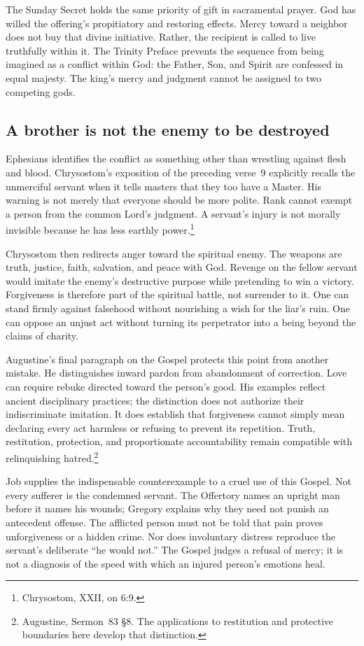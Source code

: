 The Sunday Secret holds the same priority of gift in sacramental
prayer. God has willed the offering's propitiatory and restoring
effects. Mercy toward a neighbor does not buy that divine initiative.
Rather, the recipient is called to live truthfully within it. The
Trinity Preface prevents the sequence from being imagined as a
conflict within God: the Father, Son, and Spirit are confessed in
equal majesty. The king's mercy and judgment cannot be assigned to
two competing gods.

\subsection{A brother is not the enemy to be destroyed}
Ephesians identifies the conflict as something other than wrestling
against flesh and blood. Chrysostom's exposition of the preceding
verse~9 explicitly recalls the unmerciful servant when it tells
masters that they too have a Master. His warning is not merely that
everyone should be more polite. Rank cannot exempt a person from
the common Lord's judgment. A servant's injury is not morally
invisible because he has less earthly power.\footnote{Chrysostom,
 XXII, on 6:9.}

Chrysostom then redirects anger toward the spiritual enemy. The
weapons are truth, justice, faith, salvation, and peace with God.
Revenge on the fellow servant would imitate the enemy's destructive
purpose while pretending to win a victory. Forgiveness is therefore
part of the spiritual battle, not surrender to it. One can stand
firmly against falsehood without nourishing a wish for the liar's
ruin. One can oppose an unjust act without turning its perpetrator
into a being beyond the claims of charity.

Augustine's final paragraph on the Gospel protects this point from
another mistake. He distinguishes inward pardon from abandonment
of correction. Love can require rebuke directed toward the person's
good. His examples reflect ancient disciplinary practices; the
distinction does not authorize their indiscriminate imitation. It
does establish that forgiveness cannot simply mean declaring every
act harmless or refusing to prevent its repetition. Truth, restitution,
protection, and proportionate accountability remain compatible with
relinquishing hatred.\footnote{Augustine, Sermon~83 \S8. The applications
to restitution and protective boundaries here develop that distinction.}

Job supplies the indispensable counterexample to a cruel use of this
Gospel. Not every sufferer is the condemned servant. The Offertory
names an upright man before it names his wounds; Gregory explains
why they need not punish an antecedent offense. The afflicted person
must not be told that pain proves unforgiveness or a hidden crime.
Nor does involuntary distress reproduce the servant's deliberate
``he would not.'' The Gospel judges a refusal of mercy; it is not
a diagnosis of the speed with which an injured person's emotions heal.

